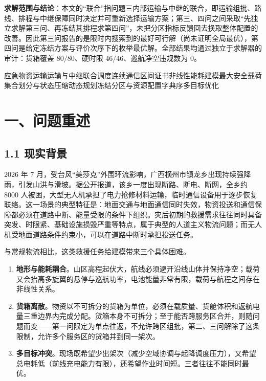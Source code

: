 \documentclass[withoutpreface,bwprint]{format}
\newcommand{\PaperKeywords}{应急物资运输\quad 运输与中继联合调度\quad 连续通信区间证书\quad 非线性能耗建模\quad 最大安全载荷\quad 集合划分与状态压缩动态规划\quad 冻结分区与资源配置\quad 字典序多目标优化}
\begin{document}
\textbf{求解范围与结论}：本文的“联合”指问题三内部运输与中继的联合，即运输组批、路线、排程与中继保障同时决定并可重新选择运输方案；第三、四问之间采取“先独立求解第三问、再冻结其排程求第四问”，未把分区指标反馈回去换取整体配置的改善。因此第三问报告的是限时内搜索到的最好可行解（尚未证明全局最优），第四问是给定冻结方案与评价次序下的枚举最优解。全部结果均通过独立于求解器的审计：货箱覆盖 $80/80$、硬时限 $46/46$、巡航净空违规数为 $0$。

\vspace{1.0em}
\quad \begingroup\song{}\PaperKeywords\endgroup\par
\endgroup

\clearpage

\begingroup
\pagestyle{empty}
\tableofcontents
\clearpage
\endgroup

\pagestyle{plain}
\setcounter{page}{1}

\section{一、问题重述}

\subsection{1.1 现实背景}
2026 年 7 月，受台风“美莎克”外围环流影响，广西横州市镇龙乡出现持续强降雨，引发山洪与滑坡。据公开报道，该乡一度出现断路、断电、断网，全乡约 8000 人被困，大型无人机承担了电力抢修材料运输，临时通信设备用于逐步恢复联络。这一场景的典型特征是：地面交通与地面通信同时失效，物资投送和通信保障都必须在道路中断、能量受限的条件下组织。灾后初期的救援需求往往同时具备突发、时限紧、基础设施损毁严重等特点，属于典型的人道主义物流问题\cite{caunhye2012, holguin2012}；而无人机受地面道路条件约束小，可以在道路中断时承担投送任务\cite{murray2015, otto2018}。

与常规物流相比，这类救援任务给建模带来三个具体困难。

\begin{enumerate}[leftmargin=*]
    \item \textbf{地形与能耗耦合}。山区高程起伏大，航线必须避开沿线山体并保持净空；载荷又会抬高多旋翼的悬停与巡航功率，电池能量非常有限，载荷与航程之间存在非线性关系。
    \item \textbf{货箱离散}。物资以不可拆分的货箱为单位，必须在载质量、货舱体积和返航电量三重边界内完成分配。货箱本身不可拆分；至于能否跨服务区合并，则随问题而变——第一问限定为单点往返，不允许跨区组批，第二、三问解除了这条限制，允许多个服务区的货箱并到同一架次。
    \item \textbf{多目标冲突}。现场既希望少出架次（减少空域协调与起降调度压力），又希望总电耗低（前线充电能力有限），还希望作业时间短。三者往往不能同时最优。
\end{enumerate}
\end{document}
